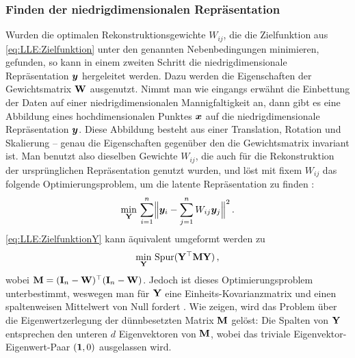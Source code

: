 \subsubsection{Finden der niedrigdimensionalen Repräsentation}
\label{ch:MethodenDerDimRed:statistisch:LLE:FindenDerRepr}
Wurden die optimalen Rekonstruktionsgewichte $W_{ij}$, die die Zielfunktion aus
\eqref{eq:LLE:Zielfunktion} unter den genannten Nebenbedingungen minimieren, gefunden, so kann in einem zweiten Schritt die niedrigdimensionale Repräsentation $\bm{y}$ hergeleitet werden. Dazu werden die Eigenschaften der Gewichtsmatrix $\mathbf{W}$ ausgenutzt. Nimmt man wie eingangs erwähnt die Einbettung der Daten auf einer niedrigdimensionalen Mannigfaltigkeit an, dann gibt es eine Abbildung eines hochdimensionalen Punktes $\bm{x}$ auf die niedrigdimensionale Repräsentation $\bm{y}$. Diese Abbildung besteht aus einer Translation, Rotation und Skalierung -- genau die Eigenschaften gegenüber den die Gewichtsmatrix invariant ist. Man benutzt also dieselben Gewichte $W_{ij}$, die auch für die Rekonstruktion der ursprünglichen Repräsentation genutzt wurden, und löst mit fixem $W_{ij}$ das folgende Optimierungsproblem, um die latente Repräsentation zu finden \parencite[2324]{Roweis.2000}:
\begin{equation}
	\label{eq:LLE:ZielfunktionY}
	\min_{\mat{Y}}\, \sum_{i = 1}^n \norm[\Big]{\vect{y}_i - \sum_{j = 1}^n W_{ij}\vect{y}_j}^2 \, .
\end{equation}
\eqref{eq:LLE:ZielfunktionY} kann äquivalent umgeformt werden zu \parencite[4]{Ghojogh.2020}
\begin{equation}
	\min_{\mathbf{Y}}\, \operatorname{Spur}(\mathbf{Y}^\top \mathbf{M} \mathbf{Y}) \, ,
\end{equation}
wobei $\mathbf{M} = (\mathbf{I}_n - \mathbf{W})^\top (\mathbf{I}_n - \mathbf{W})$. Jedoch ist dieses Optimierungsproblem unterbestimmt, weswegen man für $\mathbf{Y}$ eine Einheits-Kovarianzmatrix und einen spaltenweisen Mittelwert von Null fordert \parencite[11]{Saul.2000}. Wie \textcite[3 -- 4]{Ghojogh.2020} zeigen, wird das Problem über die
Eigenwertzerlegung der dünnbesetzten Matrix $\mathbf{M}$ gelöst: Die Spalten von $\mathbf{Y}$ entsprechen
den unteren $d$ Eigenvektoren von $\mathbf{M}$, wobei das triviale Eigenvektor-Eigenwert-Paar $(\bm{1},
	0)$ ausgelassen wird.

